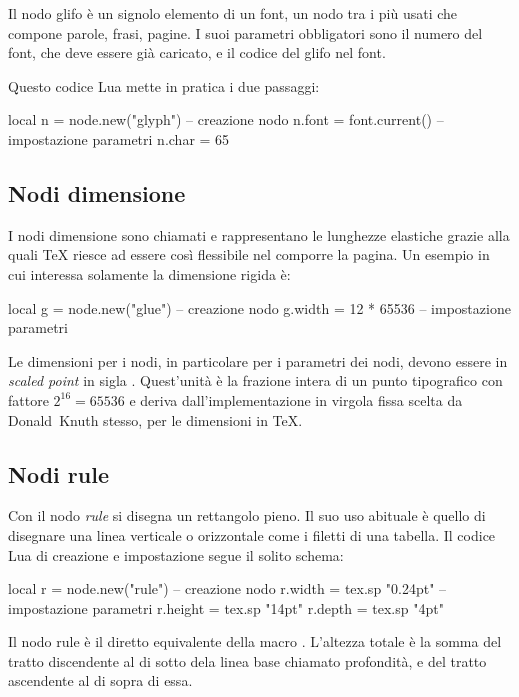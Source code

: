 Il nodo glifo è un signolo elemento di un font, un nodo tra i più usati che
compone parole, frasi, pagine. I suoi parametri obbligatori sono il numero del
font, che deve essere già caricato, e il codice del glifo nel font.

Questo codice Lua mette in pratica i due passaggi:
\begin{lines}
local n = node.new("glyph") -- creazione nodo
n.font = font.current()     -- impostazione parametri
n.char = 65
\end{lines}


\subsection{Nodi dimensione}

I nodi dimensione sono chiamati  e rappresentano le lunghezze
elastiche grazie alla quali \TeX{} riesce ad essere così flessibile nel comporre
la pagina. Un esempio in cui interessa solamente la dimensione rigida è:
\begin{lines}
local g = node.new("glue") -- creazione nodo
g.width = 12 * 65536       -- impostazione parametri
\end{lines}

Le dimensioni per i nodi, in particolare per i parametri dei nodi, devono essere
in \emph{scaled point} in sigla . Quest'unità è la frazione intera di un
punto tipografico con fattore \( 2^{16} = 65536 \) e deriva
dall'implementazione in virgola fissa scelta da Donald~Knuth stesso, per le
dimensioni in \TeX.


\subsection{Nodi rule}

Con il nodo \emph{rule} si disegna un rettangolo pieno. Il suo uso abituale è
quello di disegnare una linea verticale o orizzontale come i filetti di una
tabella. Il codice Lua di creazione e impostazione segue il solito schema:
\begin{lines}
local r = node.new("rule") -- creazione nodo
r.width = tex.sp "0.24pt"  -- impostazione parametri
r.height = tex.sp "14pt"
r.depth = tex.sp "4pt"
\end{lines}

Il nodo rule è il diretto equivalente della macro . L'altezza totale è
la somma del tratto discendente al di sotto dela linea base chiamato profondità,
e del tratto ascendente al di sopra di essa.


